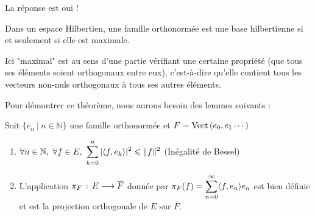 	La réponse est oui !
	
	\begin{mythm}
		Dans un espace Hilbertien, une famille orthonormée est une base hilbertienne si et seulement si elle est maximale.
	\end{mythm}
	
	Ici "maximal" est au sens d'une partie vérifiant une certaine propriété (que tous ses éléments soient orthogonaux entre eux), c'est-à-dire qu'elle contient tous les vecteurs non-nuls orthogonaux à tous ses autres éléments.
	
	Pour démontrer ce théorème, nous aurons besoin des lemmes suivants :
	
	\begin{mylemma}
		Soit $\{e_n ~ | ~ n \in \mathbb{N}\}$ une famille orthonormée et $F = \text{Vect} \, (e_0, e_1 \cdots)$
		\begin{enumerate}
			\item $\forall n \in \mathbb{N}, ~ \forall f \in E, ~ \displaystyle \sum_{k = 0}^{n} |\langle f, e_k \rangle|^2 \leqslant \|f\|^2$ (Inégalité de Bessel)
			\item L'application $\pi_F \, : \, E \longrightarrow \overline{F}$ donnée par $\displaystyle \pi_F(f) = \sum_{n = 0}^\infty \langle f, e_n \rangle e_n$ est bien définie et est la projection orthogonale de $E$ sur $\overline{F}$.
		\end{enumerate}
	\end{mylemma}
	
